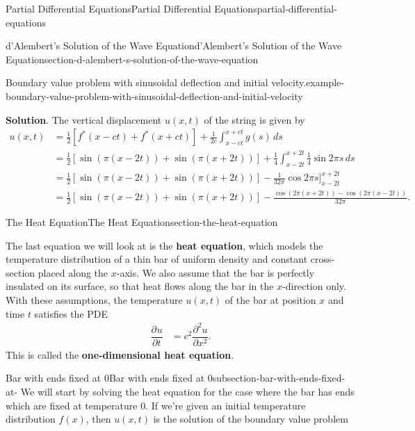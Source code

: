 \documentclass[oneside,10pt,]{book}
\newcommand{\terminology}[1]{\textbf{#1}}
\numberwithin{equation}{section}
\newcommand{\pdv}[3][]{\dfrac{\partial^{#1} #2}{\partial #3^{#1}}}
\newcommand{\amp}{&}
\begin{document}
\begin{chapterptx}{Partial Differential Equations}{}{Partial Differential Equations}{}{}{partial-differential-equations}
\begin{sectionptx}{d'Alembert's Solution of the Wave Equation}{}{d'Alembert's Solution of the Wave Equation}{}{}{section-d-alembert-s-solution-of-the-wave-equation}
\begin{example}{Boundary value problem with sinusoidal deflection and initial velocity.}{example-boundary-value-problem-with-sinusoidal-deflection-and-initial-velocity}
\par\smallskip%
\noindent\textbf{Solution}.\hypertarget{solution-96}{}\quad%
\hypertarget{p-686}{}%
The vertical displacement \(u(x,t)\) of the string is given by%
%
\begin{align*}
u(x,t) \amp = \frac{1}{2}[f^{*}(x-ct)+f^{*}(x+ct)] + \frac{1}{2c}\int_{x-ct}^{x+ct}g(s)\,ds \\
\amp = \frac{1}{2}[\sin(\pi(x-2t))+\sin(\pi(x+2t))] + \frac{1}{4}\int_{x-2t}^{x+2t}\frac{1}{4}\sin2\pi s\,ds \\
\amp = \frac{1}{2}[\sin(\pi(x-2t))+\sin(\pi(x+2t))] - \frac{1}{32\pi}\cos2\pi s\Bigg]_{x-2t}^{x+2t} \\
\amp = \frac{1}{2}[\sin(\pi(x-2t))+\sin(\pi(x+2t))] - \frac{\cos(2\pi(x+2t)) - \cos(2\pi(x-2t))}{32\pi} \text{.}
\end{align*}
\end{example}
\end{sectionptx}
%
%
\typeout{************************************************}
\typeout{************************************************}
%
\begin{sectionptx}{The Heat Equation}{}{The Heat Equation}{}{}{section-the-heat-equation}
\begin{introduction}{}%
\hypertarget{p-687}{}%
The last equation we will look at is the \terminology{heat equation}, which models the temperature distribution of a thin bar of uniform density and constant cross-section placed along the \(x\)-axis. We also assume that the bar is perfectly insulated on its surface, so that heat flows along the bar in the \(x\)-direction only. With these assumptions, the temperature \(u(x,t)\) of the bar at position \(x\) and time \(t\) satisfies the PDE%
%
\begin{align*}
\pdv{u}{t} \amp = c^{2}\pdv[2]{u}{x} \text{.}
\end{align*}
\hypertarget{p-688}{}%
This is called the \terminology{one-dimensional heat equation}.%
\end{introduction}%
%
%
\typeout{************************************************}
\typeout{************************************************}
%
\begin{subsectionptx}{Bar with ends fixed at \(0\)}{}{Bar with ends fixed at \(0\)}{}{}{subsection-bar-with-ends-fixed-at-}
\hypertarget{p-689}{}%
We will start by solving the heat equation for the case where the bar has ends which are fixed at temperature \(0\). If we're given an initial temperature distribution \(f(x)\), then \(u(x,t)\) is the solution of the boundary value problem%

\end{subsectionptx}
\end{sectionptx}
\end{chapterptx}
\end{document}
